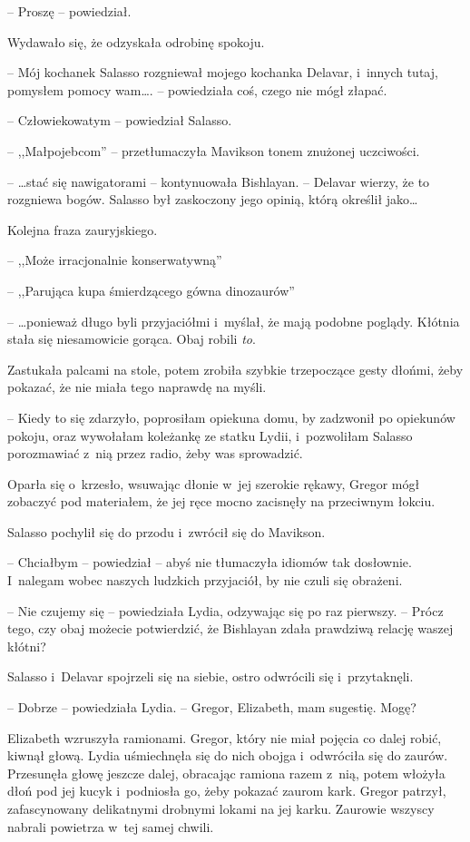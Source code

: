 \documentclass[oneside,polish,12pt,sfheadings]{mwbk}
\begin{document}
-- Proszę -- powiedział.

Wydawało się, że odzyskała odrobinę spokoju.

-- Mój kochanek Salasso rozgniewał mojego kochanka Delavar, i~innych
tutaj, pomysłem pomocy wam\ldots. -- powiedziała coś, czego nie mógł złapać.

-- Człowiekowatym -- powiedział Salasso.

-- ,,Małpojebcom'' -- przetłumaczyła Mavikson tonem znużonej uczciwości.

-- \ldots stać się nawigatorami -- kontynuowała Bishlayan. -- Delavar wierzy,
że to rozgniewa bogów. Salasso był zaskoczony jego opinią, którą
określił jako\ldots

Kolejna fraza zauryjskiego.

-- ,,Może irracjonalnie konserwatywną''

-- ,,Parująca kupa śmierdzącego gówna dinozaurów''

-- \ldots ponieważ długo byli przyjaciółmi i~myślał, że mają podobne
poglądy. Kłótnia stała się niesamowicie gorąca. Obaj robili \emph{to}.

Zastukała palcami na stole, potem zrobiła szybkie trzepoczące gesty
dłońmi, żeby pokazać, że nie miała tego naprawdę na myśli.

-- Kiedy to się zdarzyło, poprosiłam opiekuna domu, by zadzwonił po
opiekunów pokoju, oraz wywołałam koleżankę ze statku Lydii, i~pozwoliłam
Salasso porozmawiać z~nią przez radio, żeby was sprowadzić.

Oparła się o~krzesło, wsuwając dłonie w~jej szerokie rękawy, Gregor mógł
zobaczyć pod materiałem, że jej ręce mocno zacisnęły na przeciwnym
łokciu.

Salasso pochylił się do przodu i~zwrócił się do Mavikson.

-- Chciałbym -- powiedział -- abyś nie tłumaczyła idiomów tak dosłownie. I~nalegam wobec naszych ludzkich przyjaciół, by nie czuli się obrażeni.

-- Nie czujemy się -- powiedziała Lydia, odzywając się po raz pierwszy. -- Prócz tego, czy obaj możecie potwierdzić, że Bishlayan zdała prawdziwą
relację waszej kłótni?

Salasso i~Delavar spojrzeli się na siebie, ostro odwrócili się i~przytaknęli.

-- Dobrze -- powiedziała Lydia. -- Gregor, Elizabeth, mam sugestię. Mogę?

Elizabeth wzruszyła ramionami. Gregor, który nie miał pojęcia co dalej
robić, kiwnął głową. Lydia uśmiechnęła się do nich obojga i~odwróciła
się do zaurów. Przesunęła głowę jeszcze dalej, obracając ramiona razem z~nią, potem włożyła dłoń pod jej kucyk i~podniosła go, żeby pokazać zaurom
kark. Gregor patrzył, zafascynowany delikatnymi drobnymi lokami na jej
karku. Zaurowie wszyscy nabrali powietrza w~tej samej chwili.
\end{document}
